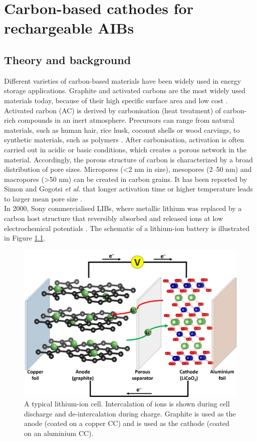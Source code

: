 \chapter{Carbon-based cathodes for rechargeable AIBs} %
\label{chap5} %
\section{Theory and background}
Different varieties of carbon-based materials have been widely used in energy storage applications. Graphite and activated carbons are the most widely used materials today, because of their high specific surface area and low cost \cite{wang_review_2012}. Activated carbon (AC) is derived by carbonisation (heat treatment) of carbon-rich compounds in an inert atmosphere. Precursors can range from natural materials, such as human hair, rice husk, coconut shells or wood carvings, to synthetic materials, such as polymers \cite{hulicovajurcakova_combined_2009,si_tunable_2013,yalcin_studies_2000,barton_tailored_1999}. After carbonisation, activation is often carried out in acidic or basic conditions, which creates a porous network in the material. Accordingly, the porous structure of carbon is characterized by a broad distribution of pore sizes. Micropores (<2 nm in size), mesopores (2–50 nm) and macropores (>50 nm) can be created in carbon grains. It has been reported by Simon and Gogotsi \textit{et al.} that longer activation time or higher temperature leads to larger mean pore size \cite{simon_materials_2008}.\\
In 2000, Sony commercialised LIBs, where metallic lithium was replaced by a carbon host structure that reversibly absorbed and released  ions at low electrochemical potentials \cite{ozawa_lithium-ion_1994}. The schematic of a lithium-ion battery is illustrated in Figure \ref{Figures/chap5fig:LIB}.
\begin{figure}[h]
\centering
\includegraphics[width=\textwidth]{Figures/chap5fig/LIB}
\caption{A typical lithium-ion cell. Intercalation of  ions is shown during cell discharge and de-intercalation during charge. Graphite is used as the anode (coated on a copper CC) and  is used as the cathode (coated on an aluminium CC).}
 \label{Figures/chap5fig:LIB}
\end{figure}
